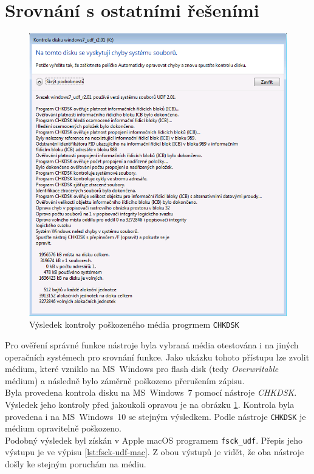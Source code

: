\section{Srovnání s ostatními řešeními}
\label{sec:srovnani}
\begin{figure}[] 
    \centering
    \includegraphics[scale=0.38]{obrazky/chkdsk.png}
    \caption{Výsledek kontroly poškozeného média progrmem \texttt{CHKDSK}}
    \label{fig:chkdsk}
\end{figure}
Pro ověření správné funkce nástroje byla vybraná média otestována i na jiných operačních systémech pro srovnání funkce. Jako ukázku tohoto přístupu lze zvolit médium, které vzniklo na MS~Windows pro flash disk (tedy \textit{Overwritable} médium) a následně bylo záměrně poškozeno přerušením zápisu.\\
Byla provedena kontrola disku na MS~Windows~7 pomocí nástroje \textit{CHKDSK}. Výsledek jeho kontroly před jakoukoli opravou je na obrázku \ref{fig:chkdsk}. Kontrola byla provedena i na MS~Windows~10 se stejným výsledkem. Podle nástroje \texttt{CHKDSK} je médium opravitelně poškozeno.\\
Podobný výsledek byl získán v Apple macOS programem \texttt{fsck\_udf}. Přepis jeho výstupu je ve výpisu \ref{lst:fsck-udf-mac}. Z obou výstupů je vidět, že oba nástroje došly ke stejným poruchám na médiu.
